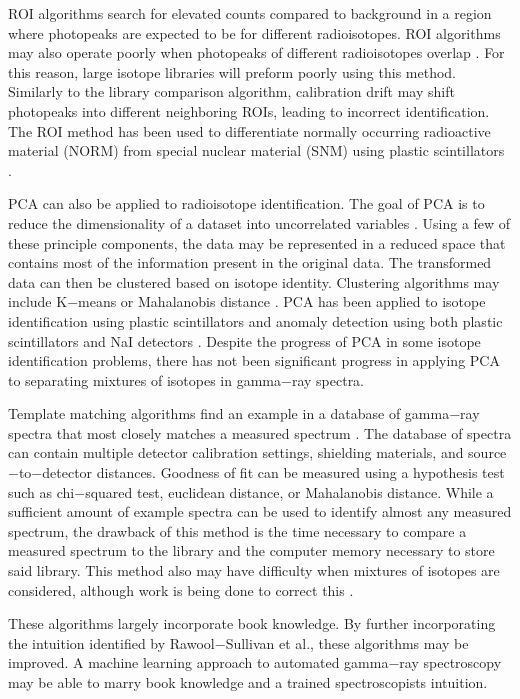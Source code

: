 \documentclass[tocnosub,noragright,centerchapter,12pt,fullpage]{uiucecethesis09}
\begin{document}
ROI algorithms search for elevated counts compared to background in a region where photopeaks are expected to be for different radioisotopes. ROI algorithms may also operate poorly when photopeaks of different radioisotopes overlap \cite{burr2009}. For this reason, large isotope libraries will preform poorly using this method. Similarly to the library comparison algorithm, calibration drift may shift photopeaks into different neighboring ROIs, leading to incorrect identification. The ROI method has been used to differentiate normally occurring radioactive material (NORM) from special nuclear material (SNM) using plastic scintillators \cite{Ely2006}.

PCA can also be applied to radioisotope identification. The goal of PCA is to reduce the dimensionality of a dataset into uncorrelated variables \cite{Jolliffe2002}. Using a few of these principle components, the data may be represented in a reduced space that contains most of the information present in the original data. The transformed data can then be clustered based on isotope identity. Clustering algorithms may include K$-$means or Mahalanobis distance \cite{Kanungo2002, Kumari2012}. PCA has been applied to isotope identification using plastic scintillators \cite{Boardman2012} and anomaly detection using both plastic scintillators and NaI detectors \cite{runkle2006b}. Despite the progress of PCA in some isotope identification problems, there has not been significant progress in applying PCA to separating mixtures of isotopes in gamma$-$ray spectra.

Template matching algorithms find an example in a database of gamma$-$ray spectra that most closely matches a measured spectrum \cite{burr2009}. The database of spectra can contain multiple detector calibration settings, shielding materials, and source$-$to$-$detector distances. Goodness of fit can be measured using a hypothesis test such as chi$-$squared test, euclidean distance, or Mahalanobis distance. While a sufficient amount of example spectra can be used to identify almost any measured spectrum, the drawback of this method is the time necessary to compare a measured spectrum to the library and the computer memory necessary to store said library. This method also may have difficulty when mixtures of isotopes are considered, although work is being done to correct this \cite{mattingly2010}.

These algorithms largely incorporate book knowledge. By further incorporating the intuition identified by Rawool$-$Sullivan et al., these algorithms may be improved. A machine learning approach to automated gamma$-$ray spectroscopy may be able to marry book knowledge and a trained spectroscopists intuition.  
\end{document}
